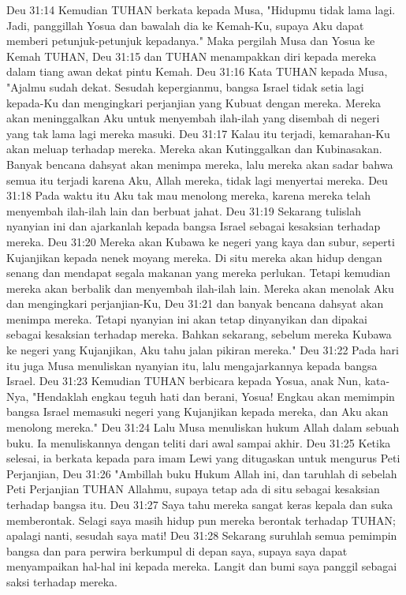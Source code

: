 Deu 31:14  Kemudian TUHAN berkata kepada Musa, "Hidupmu tidak lama lagi. Jadi, panggillah Yosua dan bawalah dia ke Kemah-Ku, supaya Aku dapat memberi petunjuk-petunjuk kepadanya." Maka pergilah Musa dan Yosua ke Kemah TUHAN,
Deu 31:15  dan TUHAN menampakkan diri kepada mereka dalam tiang awan dekat pintu Kemah.
Deu 31:16  Kata TUHAN kepada Musa, "Ajalmu sudah dekat. Sesudah kepergianmu, bangsa Israel tidak setia lagi kepada-Ku dan mengingkari perjanjian yang Kubuat dengan mereka. Mereka akan meninggalkan Aku untuk menyembah ilah-ilah yang disembah di negeri yang tak lama lagi mereka masuki.
Deu 31:17  Kalau itu terjadi, kemarahan-Ku akan meluap terhadap mereka. Mereka akan Kutinggalkan dan Kubinasakan. Banyak bencana dahsyat akan menimpa mereka, lalu mereka akan sadar bahwa semua itu terjadi karena Aku, Allah mereka, tidak lagi menyertai mereka.
Deu 31:18  Pada waktu itu Aku tak mau menolong mereka, karena mereka telah menyembah ilah-ilah lain dan berbuat jahat.
Deu 31:19  Sekarang tulislah nyanyian ini dan ajarkanlah kepada bangsa Israel sebagai kesaksian terhadap mereka.
Deu 31:20  Mereka akan Kubawa ke negeri yang kaya dan subur, seperti Kujanjikan kepada nenek moyang mereka. Di situ mereka akan hidup dengan senang dan mendapat segala makanan yang mereka perlukan. Tetapi kemudian mereka akan berbalik dan menyembah ilah-ilah lain. Mereka akan menolak Aku dan mengingkari perjanjian-Ku,
Deu 31:21  dan banyak bencana dahsyat akan menimpa mereka. Tetapi nyanyian ini akan tetap dinyanyikan dan dipakai sebagai kesaksian terhadap mereka. Bahkan sekarang, sebelum mereka Kubawa ke negeri yang Kujanjikan, Aku tahu jalan pikiran mereka."
Deu 31:22  Pada hari itu juga Musa menuliskan nyanyian itu, lalu mengajarkannya kepada bangsa Israel.
Deu 31:23  Kemudian TUHAN berbicara kepada Yosua, anak Nun, kata-Nya, "Hendaklah engkau teguh hati dan berani, Yosua! Engkau akan memimpin bangsa Israel memasuki negeri yang Kujanjikan kepada mereka, dan Aku akan menolong mereka."
Deu 31:24  Lalu Musa menuliskan hukum Allah dalam sebuah buku. Ia menuliskannya dengan teliti dari awal sampai akhir.
Deu 31:25  Ketika selesai, ia berkata kepada para imam Lewi yang ditugaskan untuk mengurus Peti Perjanjian,
Deu 31:26  "Ambillah buku Hukum Allah ini, dan taruhlah di sebelah Peti Perjanjian TUHAN Allahmu, supaya tetap ada di situ sebagai kesaksian terhadap bangsa itu.
Deu 31:27  Saya tahu mereka sangat keras kepala dan suka memberontak. Selagi saya masih hidup pun mereka berontak terhadap TUHAN; apalagi nanti, sesudah saya mati!
Deu 31:28  Sekarang suruhlah semua pemimpin bangsa dan para perwira berkumpul di depan saya, supaya saya dapat menyampaikan hal-hal ini kepada mereka. Langit dan bumi saya panggil sebagai saksi terhadap mereka.
